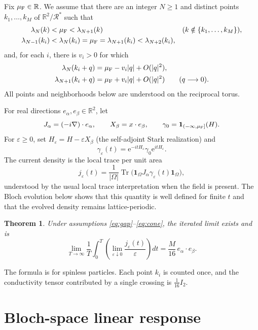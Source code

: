 \documentclass[11pt,a4paper]{article}
\DeclareMathOperator{\Tr}{Tr}
\newcommand{\R}{\mathbb R}
\newcommand{\ind}{\mathbf 1}
\newcommand{\e}{\mathrm e}
\newtheorem{theorem}{Theorem}
\begin{document}
Fix $\mu_{\rm F}\in\R$. We assume that there are an integer $N\geq1$ and
distinct points $k_1,\ldots,k_M$ of $\R^2/\mathcal R^*$ such that
\begin{align}
 \lambda_N(k)&<\mu_{\rm F}<\lambda_{N+1}(k)
 &&(k\notin\{k_1,\ldots,k_M\}),\label{eq:gap}\\
 \lambda_{N-1}(k_i)&<\lambda_N(k_i)=\mu_{\rm F}
 =\lambda_{N+1}(k_i)<\lambda_{N+2}(k_i),\label{eq:cross}
\end{align}
and, for each $i$, there is $v_i>0$ for which
\begin{align}
 \lambda_N(k_i+q)&=\mu_{\rm F}-v_i|q|+O(|q|^2),\notag\\
 \lambda_{N+1}(k_i+q)&=\mu_{\rm F}+v_i|q|+O(|q|^2)
 \qquad(q\longrightarrow0).\label{eq:cone}
\end{align}
All points and neighborhoods below are understood on the reciprocal torus.

For real directions $e_\alpha,e_\beta\in\R^2$, let
\[
 J_\alpha=(-i\nabla)\cdot e_\alpha,\qquad X_\beta=x\cdot e_\beta,
 \qquad \gamma_0=\ind_{(-\infty,\mu_{\rm F}]}(H).
\]
For $\varepsilon\geq0$, set $H_\varepsilon=H-\varepsilon X_\beta$ (the
self-adjoint Stark realization) and
\[
 \gamma_\varepsilon(t)=\e^{-itH_\varepsilon}\gamma_0\e^{itH_\varepsilon}.
\]
The current density is the local trace per unit area
\[
 j_\varepsilon(t)=\frac1{|\Omega|}
 \Tr\bigl(\ind_\Omega J_\alpha\gamma_\varepsilon(t)\ind_\Omega\bigr),
\]
understood by the usual local trace interpretation when the field is present.
The Bloch evolution below shows that this quantity is well defined for finite
$t$ and that the evolved density remains lattice-periodic.

\begin{theorem}\label{thm:main}
Under assumptions \eqref{eq:gap}--\eqref{eq:cone}, the iterated limit exists
and is
\begin{equation}\label{eq:main}
 \lim_{T\to\infty}\frac1T\int_0^T
 \left(\lim_{\varepsilon\downarrow0}
       \frac{j_\varepsilon(t)}{\varepsilon}\right)dt
 =\frac{M}{16}\,e_\alpha\cdot e_\beta.
\end{equation}
\end{theorem}

The formula is for spinless particles. Each point $k_i$ is counted once, and
the conductivity tensor contributed by a single crossing is $\frac1{16}I_2$.

\section{Bloch-space linear response}
\end{document}

